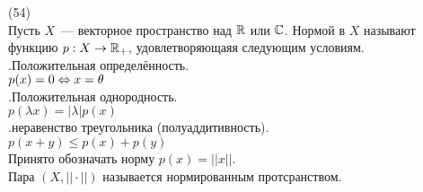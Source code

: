 (54)\\
Пусть $X$~--- векторное пространство над $\mathbb{R}$ или $\mathbb{C}$. Нормой в $X$ называют функцию $p: X\to\mathbb{R}_+$, удовлетворяющаяя следующим условиям.\\
.\q Положительная определённость.\\
$p(x) = 0 \Leftrightarrow x = \theta$\\
.\q Положительная однородность.\\
$p(\lambda x) = |\lambda|p(x)$\\
.\q неравенство треугольника (полуаддитивность).\\
$p(x + y) \le p(x) + p(y)$\\
Принято обозначать норму $p(x) = ||x||$.\\
Пара $(X, ||\cdot||)$ называется нормированным протсранством.